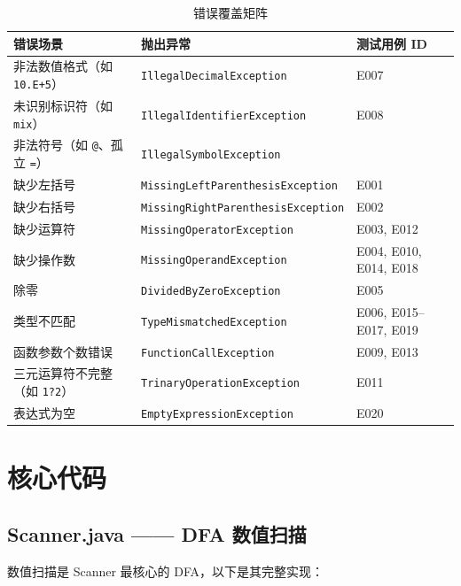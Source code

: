 \documentclass[a4paper]{article}
\begin{document}
\begin{table}[H]
\centering
\caption{错误覆盖矩阵}
\begin{tabular}{@{}p{4cm}p{6cm}p{4cm}@{}}
\toprule
\textbf{错误场景} & \textbf{抛出异常} & \textbf{测试用例 ID} \\
\midrule
非法数值格式（如 \texttt{10.E+5}） & \texttt{IllegalDecimalException} & E007 \\
未识别标识符（如 \texttt{mix}） & \texttt{IllegalIdentifierException} & E008 \\
非法符号（如 \texttt{@}、孤立 \texttt{=}） & \texttt{IllegalSymbolException} & \\
缺少左括号 & \texttt{MissingLeftParenthesisException} & E001 \\
缺少右括号 & \texttt{MissingRightParenthesisException} & E002 \\
缺少运算符 & \texttt{MissingOperatorException} & E003, E012 \\
缺少操作数 & \texttt{MissingOperandException} & E004, E010, E014, E018 \\
除零 & \texttt{DividedByZeroException} & E005 \\
类型不匹配 & \texttt{TypeMismatchedException} & E006, E015--E017, E019 \\
函数参数个数错误 & \texttt{FunctionCallException} & E009, E013 \\
三元运算符不完整（如 \texttt{1?2}） & \texttt{TrinaryOperationException} & E011 \\
表达式为空 & \texttt{EmptyExpressionException} & E020 \\
\bottomrule
\end{tabular}
\label{tab:errors}
\end{table}

\section{核心代码}

\subsection{Scanner.java —— DFA 数值扫描}

数值扫描是 Scanner 最核心的 DFA，以下是其完整实现：
\end{document}

